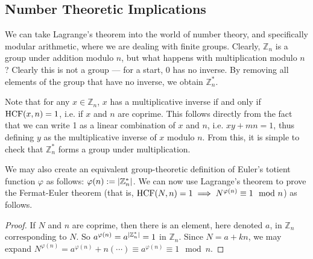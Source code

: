 \subsection{Number Theoretic Implications}
We can take Lagrange's theorem into the world of number theory, and specifically modular arithmetic, where we are dealing with finite groups. Clearly, $\mathbb Z_n$ is a group under addition modulo $n$, but what happens with multiplication modulo $n$? Clearly this is not a group --- for a start, 0 has no inverse. By removing all elements of the group that have no inverse, we obtain $\mathbb Z_n^*$.

Note that for any $x \in \mathbb Z_n$, $x$ has a multiplicative inverse if and only if $\operatorname{HCF}(x, n) = 1$, i.e. if $x$ and $n$ are coprime. This follows directly from the fact that we can write 1 as a linear combination of $x$ and $n$, i.e. $xy + mn = 1$, thus defining $y$ as the multiplicative inverse of $x$ modulo $n$. From this, it is simple to check that $\mathbb Z_n^*$ forms a group under multiplication.

We may also create an equivalent group-theoretic definition of Euler's totient function $\varphi$ as follows: $\varphi(n) := \abs{\mathbb Z_n^*}$. We can now use Lagrange's theorem to prove the Fermat-Euler theorem (that is, $\operatorname{HCF}(N, n) = 1 \implies N^{\varphi(n)} \equiv 1 \mod n$) as follows.
\begin{proof}
	If $N$ and $n$ are coprime, then there is an element, here denoted $a$, in $\mathbb Z_n$ corresponding to $N$. So $a^{\varphi(n)} = a^{\abs{\mathbb Z_n^*}} = 1$ in $\mathbb Z_n$. Since $N = a + kn$, we may expand $N^{\varphi(n)} = a^{\varphi(n)} + n(\cdots) \equiv a^{\varphi(n)} \equiv 1 \mod n$.
\end{proof}
